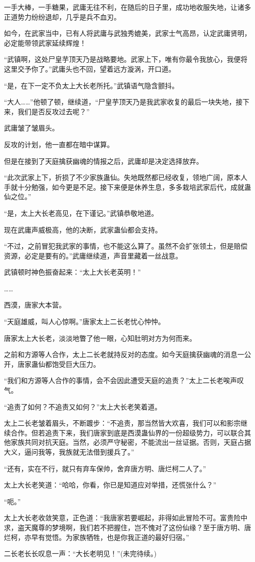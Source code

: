 \begin{this_body}
一手大棒，一手糖果，武庸无往不利，在随后的日子里，成功地收服失地，让诸多正道势力纷纷退却，几乎是兵不血刃。

如今，在武家当中，已有人将武庸与武独秀媲美，武家士气高昂，认定武庸贤明，必定能带领武家延续辉煌！

“武镇啊，这处尸皇芋顶天乃是战略要地。武家上下，唯有你最令我放心，我便将这里交予你了。”武庸头也不回，望着远方漩涡，开口道。

“是，在下一定不负太上大长老所托。”武镇语气隐含颤抖。

“大人……”他顿了顿，继续道，“尸皇芋顶天乃是我武家收复的最后一块失地，接下来，我们是否反攻过去呢？”

武庸皱了皱眉头。

反攻的计划，他一直都在暗中谋算。

但是在接到了天庭擒获幽魂的情报之后，武庸却是决定选择放弃。

“此次武家上下，折损了不少家族蛊仙。失地既然都已经收复，领地广阔，原本人手就十分勉强，如今更是不足。接下来便是休养生息，多多栽培武家后代，成就蛊仙之位。”

“是，太上大长老高见，在下谨记。”武镇恭敬地道。

现在武庸声威极高，他的决断，武家蛊仙都会支持。

“不过，之前冒犯我武家的事情，也不能这么算了。虽然不会扩张领土，但是赔偿资源，必定是要有的。”武庸继续道，声音里藏着一丝战意。

武镇顿时神色振奋起来：“太上大长老英明！”

……

西漠，唐家大本营。

“天庭雄威，叫人心惊啊。”唐家太上二长老忧心忡忡。

唐家太上大长老，淡淡地瞥了他一眼，心知肚明对方为何而来。

之前和方源等人合作，太上二长老就持反对的态度。如今天庭擒获幽魂的消息一公开，唐家蛊仙都饱受巨大压力。

“我们和方源等人合作的事情，会不会因此遭受天庭的追责？”太上二长老唉声叹气。

“追责了如何？不追责又如何？”太上大长老笑着道。

太上二长老皱着眉头，不断踱步：“不追责，那当然皆大欢喜，我们可以和影宗继续合作。但若追责下来，我们唐家到底是西漠蛊仙界的一份超级势力，可以联合其他家族共同对抗天庭。当然，必须严守秘密，不能流出一丝证据。否则，天庭占据大义，逼问我等，我族就无法借到援兵了。”

“还有，实在不行，就只有弃车保帅，舍弃唐方明、唐烂柯二人了。”

太上大长老笑道：“哈哈，你看，你已是知道应对举措，还慌张什么？”

“呃。”

太上大长老收敛笑意，正色道：“我唐家若要崛起，非得如此冒险不可。富贵险中求，盗天魔尊的梦境啊，我们若不把握住，岂不愧对了这份仙缘？至于唐方明、唐烂柯，亦早有觉悟。为家族牺牲，也是你我正道的最好归宿。”

二长老长长叹息一声：“大长老明见！”(未完待续。)

\end{this_body}

